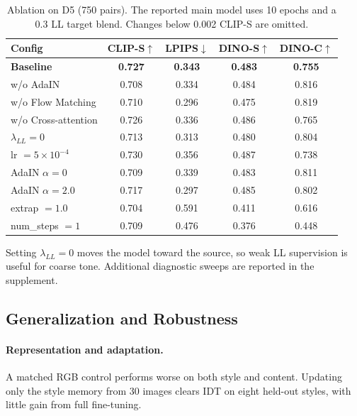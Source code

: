 \documentclass[letterpaper]{article}
\begin{document}
\begin{table}[ht]
\centering
\footnotesize
\setlength{\tabcolsep}{4pt}
\begin{tabular}{@{}lcccc@{}}
\toprule
Config & CLIP-S$\uparrow$ & LPIPS$\downarrow$ & DINO-S$\uparrow$ & DINO-C$\uparrow$ \\
\midrule
\textbf{Baseline} & \textbf{0.727} & \textbf{0.343} & \textbf{0.483} & \textbf{0.755} \\
\midrule
w/o AdaIN & 0.708 & 0.334 & 0.484 & 0.816 \\
w/o Flow Matching & 0.710 & 0.296 & 0.475 & 0.819 \\
w/o Cross-attention & 0.726 & 0.336 & 0.486 & 0.765 \\
\midrule
$\lambda_{LL}{=}0$ & 0.713 & 0.313 & 0.480 & 0.804 \\
lr $=5{\times}10^{-4}$ & 0.730 & 0.356 & 0.487 & 0.738 \\
\midrule
AdaIN $\alpha{=}0$ & 0.709 & 0.339 & 0.483 & 0.811 \\
AdaIN $\alpha{=}2.0$ & 0.717 & 0.297 & 0.485 & 0.802 \\
extrap $=1.0$ & 0.704 & 0.591 & 0.411 & 0.616 \\
num\_steps $=1$ & 0.709 & 0.476 & 0.376 & 0.448 \\
\bottomrule
\end{tabular}
\caption{Ablation on D5 (750 pairs). The reported main model uses 10 epochs and a 0.3 LL target blend. Changes below 0.002 CLIP-S are omitted.}
\label{tab:ablation}
\end{table}

Setting $\lambda_{LL}=0$ moves the model toward the source, so weak LL supervision is useful
for coarse tone. Additional diagnostic sweeps are reported in the supplement.









\subsection{Generalization and Robustness}
\label{sec:gen}

\paragraph{Representation and adaptation.}
A matched RGB control performs worse on both style and content. Updating only the style
memory from 30 images clears IDT on eight held-out styles, with little gain from full
fine-tuning.
\end{document}
